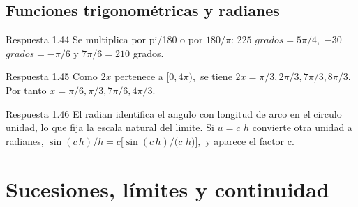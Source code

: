 \documentclass[10pt,a4paper,oneside,openany]{book}
\begin{document}
\section{Funciones trigonométricas y radianes}
\begin{PSevenAnswerFixed}{Respuesta 1.44}
Se multiplica por pi/180 o por \(180/\pi \): \(225\) \(grados=5\pi /4,\) \(-30\) \(grados=-\pi /6\) y \(7\pi /6=210\) grados.
\end{PSevenAnswerFixed}
\begin{PSevenAnswerFixed}{Respuesta 1.45}
Como \(2x\) pertenece a \([0,4\pi ),\) se tiene \(2x=\pi /3,2\pi /3,7\pi /3,8\pi /3\). Por tanto \(x=\pi /6,\pi /3,7\pi /6,4\pi /3\).
\end{PSevenAnswerFixed}
\begin{PSevenAnswerFixed}{Respuesta 1.46}
El radian identifica el angulo con longitud de arco en el circulo unidad, lo que fija la escala natural del limite. Si \(u=c\) \(h\) convierte otra unidad a radianes, \(\sin(c\,h)/h=c[\sin(c\,h)/(c\) \(h)],\) y aparece el factor c.
\end{PSevenAnswerFixed}
\chapter{Sucesiones, límites y continuidad}
\end{document}
